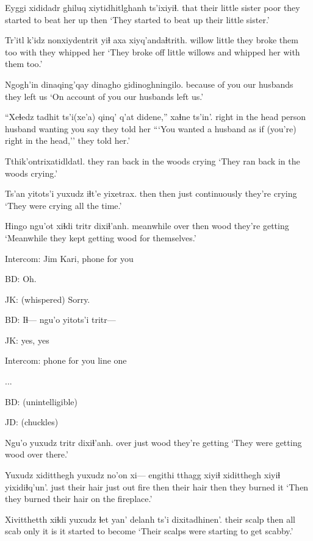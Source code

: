 \documentclass[12pt]{article}
\begin{document}
\gll Eyggi xididadr ghiluq xiytidhitlghanh ts'ixiyiɬ.
that {their little sister} poor {they started to beat her up} then
\glt `They started to beat up their little sister.'
\glend

\gll Tr'itl k'idz nonxiydentrit yiɬ axa xiyq'andaɬtrith.
willow little {they broke them} too with {they whipped her}
\glt `They broke off little willows and whipped her with them too.'
\glend

\gll Ngogh'in dinaqing'qay {dinagho gidinoghningilo}. 
{because of you} {our husbands} {they left us}
\glt `On account of you our husbands left us.'
\glend

\gll ``{Xeɬedz tadhit} ts'i(xe'a) qinq' q'at didene,'' xaɬne ts'in'.
{right in the head person} {} husband {wanting} {you say} {they told her}
\glt ```You wanted a husband as if (you're) right in the head,'' they told her.'
\glend

\gll Tthik'ontrixatidldatl.
{{they ran back in the woods crying}}
\glt `They ran back in the woods crying.'
\glend

\gll Ts'an yitots'i yuxudz iɬt'e yixetrax.
then then just continuously {they're crying}
\glt `They were crying all the time.'
\glend

\gll Hingo ngu'ot xiɬdi tritr dixiɬ'anh.
meanwhile over then wood {they're getting}
\glt `Meanwhile they kept getting wood for themselves.'
\glend

Intercom:  Jim Kari, phone for you

BD:  Oh.

JK:  (whispered) Sorry. 

BD:  Iɬ--- ngu'o yitots'i tritr---

JK:  yes, yes

Intercom:  phone for you line one

...

BD: (unintelligible)

JD: (chuckles)

\gll Ngu'o yuxudz tritr dixiɬ'anh.
over just wood {they're getting}
\glt `They were getting wood over there.'
\glend

\gll Yuxudz xiditthegh yuxudz {no'on xi---} engithi tthagg xiyiɬ xiditthegh xiyiɬ yixidiɬq'un'.
just {their hair} just {} out fire then {their hair} then {they burned it}
\glt `Then they burned their hair on the fireplace.'
\glend

\gll Xivitthetth xiɬdi yuxudz ɬet yan' delanh ts'i dixitadhinen'.
{their scalp} then all scab only {it is} {} {it started to become}
\glt `Their scalps were starting to get scabby.'
\glend
\end{document}

